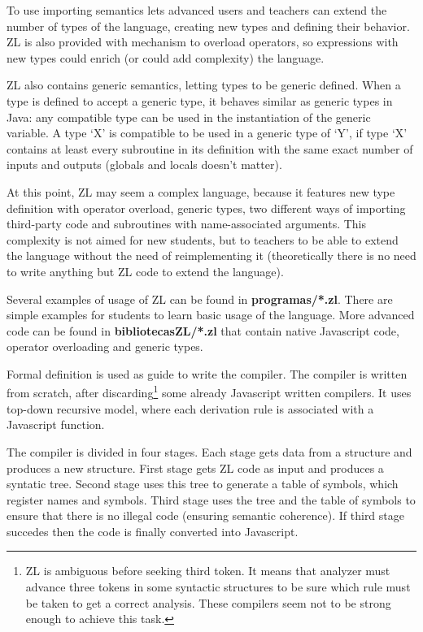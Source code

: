 \documentclass{report}
\begin{document}
	To use importing semantics lets advanced users and teachers can extend the number of types of the language, creating new types and defining their behavior. ZL is also provided with mechanism to overload operators, so expressions with new types could enrich (or could add complexity) the language. 
	
	ZL also contains generic semantics, letting types to be generic defined. When a type is defined to accept a generic type, it behaves similar as generic types in Java: any compatible type can be used in the instantiation of the generic variable. A type `X' is compatible to be used in a generic type of `Y', if type `X' contains at least every subroutine in its definition with the same exact number of inputs and outputs (globals and locals doesn't matter).  
	
	At this point, ZL may seem a complex language, because it features new type definition with operator overload, generic types, two different ways of importing third-party code and subroutines with name-associated arguments. This complexity is not aimed for new students, but to teachers to be able to extend the language without the need of reimplementing it (theoretically there is no need to write anything but ZL code to extend the language). 

	Several examples of usage of ZL can be found in \textbf{programas/*.zl}. There are simple examples for students to learn basic usage of the language. More advanced code can be found in \textbf{bibliotecasZL/*.zl} that contain native Javascript code, operator overloading and generic types. 
	
	Formal definition is used as guide to write the compiler. The compiler is written from scratch, after discarding\footnote{ZL is ambiguous before seeking third token. It means that analyzer must advance three tokens in some syntactic structures to be sure which rule must be taken to get a correct analysis. These compilers seem not to be strong enough to achieve this task.} some already Javascript written compilers. It uses top-down recursive model, where each derivation rule is associated with a Javascript function. 
	
	The compiler is divided in four stages. Each stage gets data from a structure and produces a new structure. First stage gets ZL code as input and produces a syntatic tree. Second stage uses this tree to generate a table of symbols, which register names and symbols. Third stage uses the tree and the table of symbols to ensure that there is no illegal code (ensuring semantic coherence). If third stage succedes then the code is finally converted into Javascript.
	
\end{document}
